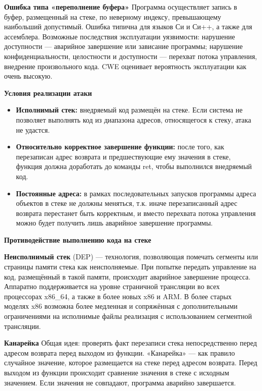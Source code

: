 
\textbf{Ошибка типа «переполнение буфера»}
Программа осуществляет запись в буфер, размещенный на стеке, по неверному индексу, превышающему наибольший допустимый. Ошибка типична для языков Си и Си++, а также для ассемблера. Возможные последствия эксплуатации уязвимости: нарушение доступности — аварийное завершение или зависание программы; нарушение конфиденциальности, целостности и доступности — перехват потока управления, внедрение произвольного кода. CWE оценивает вероятность эксплуатации как очень высокую.

\textbf{Условия реализации атаки}
\begin{itemize}
    \item \textbf{Исполнимый стек:} внедряемый код размещён на стеке. Если система не позволяет выполнять код из диапазона адресов, относящегося к стеку, атака не удастся.
    \item \textbf{Относительно корректное завершение функции:} после того, как перезаписан адрес возврата и предшествующие ему значения в стеке, функция должна доработать до команды ret, чтобы выполнился внедряемый код.
    \item \textbf{Постоянные адреса: }в рамках последовательных запусков программы адреса объектов в стеке не должны меняться, т.к. иначе перезаписанный адрес возврата перестанет быть корректным, и вместо перехвата потока управления можно будет получить лишь аварийное завершение программы.
\end{itemize}

\textbf{Противодействие выполнению кода на стеке}

\textbf{Неисполнимый стек} (DEP) — технология, позволяющая помечать сегменты или страницы памяти стека как неисполняемые. При попытке передать управление на код, размещённый в такой памяти, происходит аварийное завершение процесса. Аппаратно поддерживается на уровне страничной трансляции во всех процессорах x86\_64, а также в более новых x86 и ARM. В более старых моделях x86 возможна более медленная и сопряжённая с дополнительными ограничениями на исполнимые файлы реализация с использованием сегментной трансляции.

\textbf{Канарейка }
Общая идея: проверять факт перезаписи стека непосредственно перед адресом возврата перед выходом из функции. «Канарейка» — как правило случайное значение, которое размещается на стеке перед адресом возврата. Перед выходом из функции происходит сравнение значения в стеке с исходным значением. Если значения не совпадают, программа аварийно завершается.

